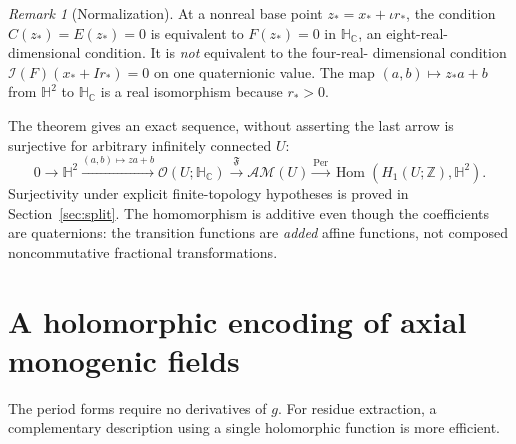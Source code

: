 \documentclass[11pt,a4paper]{article}
\numberwithin{equation}{section}
\theoremstyle{definition}
\theoremstyle{remark}
\newtheorem{remark}[theorem]{Remark}
\newcommand{\C}{\mathbb C}
\newcommand{\HH}{\mathbb H}
\newcommand{\HC}{\mathbb H_{\C}}
\newcommand{\Ind}{\mathcal I}
\newcommand{\Fu}{\mathfrak F}
\newcommand{\AM}{\mathcal{AM}}
\newcommand{\Hol}{\mathcal O}
\newcommand{\Per}{\operatorname{Per}}
\newcommand{\Hone}{H_1}
\newcommand{\Z}{\mathbb Z}
\begin{document}
\begin{remark}[Normalization]
At a nonreal base point $z_*=x_*+\iota r_*$, the condition
$C(z_*)=E(z_*)=0$ is equivalent to $F(z_*)=0$ in $\HC$, an eight-real-
dimensional condition. It is \emph{not} equivalent to the four-real-
dimensional condition $\Ind(F)(x_*+I r_*)=0$ on one quaternionic value.
The map $(a,b)\mapsto z_*a+b$ from $\HH^2$ to $\HC$ is a real isomorphism
because $r_*>0$.
\end{remark}

The theorem gives an exact sequence, without asserting the last arrow
is surjective for arbitrary infinitely connected $U$:
\begin{equation}\label{eq:exact-general}
 0\longrightarrow\HH^2\xrightarrow{(a,b)\mapsto za+b}
 \Hol(U;\HC)\xrightarrow{\Fu}\AM(U)
 \xrightarrow{\Per}\operatorname{Hom}(\Hone(U;\Z),\HH^2).
\end{equation}
Surjectivity under explicit finite-topology hypotheses is proved in
Section~\ref{sec:split}. The homomorphism is additive even though the
coefficients are quaternions: the transition functions are \emph{added}
affine functions, not composed noncommutative fractional transformations.

\section{A holomorphic encoding of axial monogenic fields}
\label{sec:encoding}

The period forms require no derivatives of $g$. For residue extraction,
a complementary description using a single holomorphic function is more
efficient.
\end{document}
